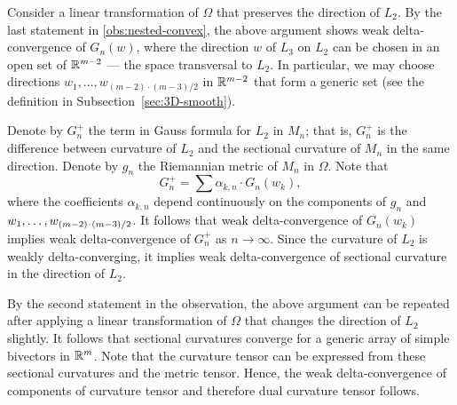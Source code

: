 Consider a linear transformation of $\Omega$ that preserves the direction of $L_2$.
By the last statement in \ref{obs:nested-convex},
the above argument shows weak delta-convergence of $G_n(w)$, where the direction $w$ of $L_3$ on $L_2$ can be chosen in an open set of $\mathbb{R}^{m-2}$ --- the space transversal to $L_2$.
In particular, we may choose directions $w_1,\dots, w_{(m-2)\cdot(m-3)/2}$ in $\mathbb{R}^{m-2}$ that form a generic set (see the  definition in Subsection~\ref{sec:3D-smooth}).

Denote by $G_n^+$ the term in Gauss formula for $L_2$ in $M_n$;
that is, $G_n^+$ is the difference between curvature of $L_2$ and the sectional curvature of $M_n$ in the same direction.
Denote by $g_n$ the Riemannian metric of $M_n$ in $\Omega$.
Note that 
\[G_n^+=\sum\alpha_{k,n}\cdot G_n(w_k),\]
where the coefficients $\alpha_{k,n}$ depend continuously on the components of $g_n$ and $w_1,\zz\dots, w_{(m-2)\cdot(m-3)/2}$. 
It follows that weak delta-convergence of $G_n(w_k)$ implies weak delta-convergence of $G_n^+$ as $n\to\infty$.
Since the curvature of $L_2$ is weakly delta-converging, it implies weak delta-convergence of sectional curvature in the direction of $L_2$.

By the second statement in the observation,
the above argument can be repeated after applying a linear transformation of $\Omega$ that changes the direction of $L_2$ slightly.
It follows that sectional curvatures converge for a generic array of simple bivectors in $\mathbb{R}^m$.
Note that the curvature tensor can be expressed from these sectional curvatures and the metric tensor.
Hence, the weak delta-convergence of components of curvature tensor and therefore dual curvature tensor follows.
\qeds

